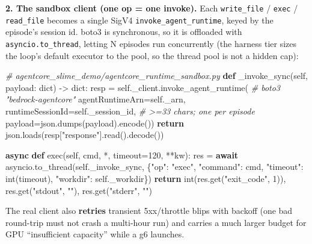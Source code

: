 \documentclass[
  paper=a4,
  ,captions=tableheading
]{scrartcl}
\newenvironment{Shaded}{}{}
\newcommand{\BuiltInTok}[1]{\textcolor[rgb]{0.00,0.50,0.00}{#1}}
\newcommand{\CommentTok}[1]{\textcolor[rgb]{0.38,0.63,0.69}{\textit{#1}}}
\newcommand{\ControlFlowTok}[1]{\textcolor[rgb]{0.00,0.44,0.13}{\textbf{#1}}}
\newcommand{\DecValTok}[1]{\textcolor[rgb]{0.25,0.63,0.44}{#1}}
\newcommand{\KeywordTok}[1]{\textcolor[rgb]{0.00,0.44,0.13}{\textbf{#1}}}
\newcommand{\NormalTok}[1]{#1}
\newcommand{\OperatorTok}[1]{\textcolor[rgb]{0.40,0.40,0.40}{#1}}
\newcommand{\StringTok}[1]{\textcolor[rgb]{0.25,0.44,0.63}{#1}}
\newcommand{\VariableTok}[1]{\textcolor[rgb]{0.10,0.09,0.49}{#1}}
\begin{document}
\textbf{2. The sandbox client (one op = one invoke).} Each
\texttt{write\_file} / \texttt{exec} / \texttt{read\_file} becomes a
single SigV4 \texttt{invoke\_agent\_runtime}, keyed by the episode's
session id. boto3 is synchronous, so it is offloaded with
\texttt{asyncio.to\_thread}, letting N episodes run concurrently (the
harness tier sizes the loop's default executor to the pool, so the
thread pool is not a hidden cap):

\begin{Shaded}
\begin{Highlighting}[]
\CommentTok{\# agentcore\_slime\_demo/agentcore\_runtime\_sandbox.py}
\KeywordTok{def}\NormalTok{ \_invoke\_sync(}\VariableTok{self}\NormalTok{, payload: }\BuiltInTok{dict}\NormalTok{) }\OperatorTok{{-}\textgreater{}} \BuiltInTok{dict}\NormalTok{:}
\NormalTok{    resp }\OperatorTok{=} \VariableTok{self}\NormalTok{.\_client.invoke\_agent\_runtime(               }\CommentTok{\# boto3 "bedrock{-}agentcore"}
\NormalTok{        agentRuntimeArn}\OperatorTok{=}\VariableTok{self}\NormalTok{.\_arn,}
\NormalTok{        runtimeSessionId}\OperatorTok{=}\VariableTok{self}\NormalTok{.\_session\_id,                  }\CommentTok{\# \textgreater{}=33 chars; one per episode}
\NormalTok{        payload}\OperatorTok{=}\NormalTok{json.dumps(payload).encode())}
    \ControlFlowTok{return}\NormalTok{ json.loads(resp[}\StringTok{"response"}\NormalTok{].read().decode())}

\ControlFlowTok{async} \KeywordTok{def} \BuiltInTok{exec}\NormalTok{(}\VariableTok{self}\NormalTok{, cmd, }\OperatorTok{*}\NormalTok{, timeout}\OperatorTok{=}\DecValTok{120}\NormalTok{, }\OperatorTok{**}\NormalTok{kw):}
\NormalTok{    res }\OperatorTok{=} \ControlFlowTok{await}\NormalTok{ asyncio.to\_thread(}\VariableTok{self}\NormalTok{.\_invoke\_sync,}
\NormalTok{              \{}\StringTok{"op"}\NormalTok{: }\StringTok{"exec"}\NormalTok{, }\StringTok{"command"}\NormalTok{: cmd, }\StringTok{"timeout"}\NormalTok{: }\BuiltInTok{int}\NormalTok{(timeout), }\StringTok{"workdir"}\NormalTok{: }\VariableTok{self}\NormalTok{.\_workdir\})}
    \ControlFlowTok{return} \BuiltInTok{int}\NormalTok{(res.get(}\StringTok{"exit\_code"}\NormalTok{, }\DecValTok{1}\NormalTok{)), res.get(}\StringTok{"stdout"}\NormalTok{, }\StringTok{""}\NormalTok{), res.get(}\StringTok{"stderr"}\NormalTok{, }\StringTok{""}\NormalTok{)}
\end{Highlighting}
\end{Shaded}

The real client also \textbf{retries} transient 5xx/throttle blips with
backoff (one bad round-trip must not crash a multi-hour run) and carries
a much larger budget for GPU ``insufficient capacity'' while a g6
launches.
\end{document}
